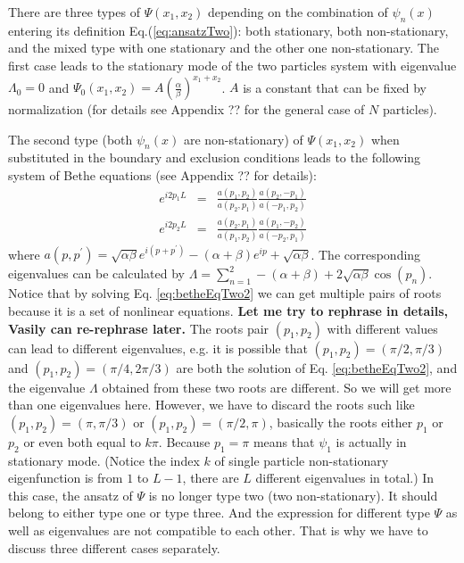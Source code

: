 \documentclass[aps,showpacs,twocolumn,floatfix,prx,superscriptaddress]{revtex4-1}
\begin{document}
There are three types of $\Psi(x_1, x_2)$ depending on the combination of $\psi_n(x)$ entering its definition Eq.(\ref{eq:ansatzTwo}): both stationary, both non-stationary, and the mixed type with one stationary and the other one non-stationary. The first case leads to the stationary mode of the two particles system with eigenvalue $\Lambda_0 = 0$ and $\Psi_0(x_1, x_2) = A \left(\frac{\alpha}{\beta}\right)^{x_1+x_2}$. $A$ is a constant that can be fixed by normalization (for details see Appendix ?? for the general case of $N$ particles).

The second type (both $\psi_n(x)$ are non-stationary) of $\Psi(x_1, x_2)$ when substituted in the boundary and exclusion conditions leads to the following system of Bethe equations \cite{} (see Appendix ?? for details):
\begin{subequations}
    \label{eq:betheEqTwo2}
    \begin{eqnarray}
        e^{i2p_1L} & = & \frac{a(p_1, p_2)}{a(p_2, p_1)} 
        \frac{a(p_2, -p_1)}{a(-p_1, p_2)}\\
        e^{i2p_2L} & = & \frac{a(p_2, p_1)}{a(p_1, p_2)} 
        \frac{a(p_1, -p_2)}{a(-p_2, p_1)}
    \end{eqnarray}
\end{subequations}
where $a(p, p^\prime) = \sqrt{\alpha\beta}e^{i(p+p^\prime)}-(\alpha+\beta)e^{ip}+\sqrt{\alpha\beta}$. 
The corresponding eigenvalues can be calculated by $\Lambda = \sum_{n=1}^2 -(\alpha+\beta)+2\sqrt{\alpha\beta}\cos(p_n)$. Notice that by solving Eq. \eqref{eq:betheEqTwo2} we can get multiple pairs of roots because it is a set of nonlinear equations. 
{\bf Let me try to rephrase in details, Vasily can re-rephrase later.} 
    The roots pair $(p_1, p_2)$ with different values can lead to different eigenvalues, e.g. it is possible that $(p_1, p_2) = (\pi/2, \pi/3)$ and $(p_1, p_2) = (\pi/4, 2\pi/3)$ are both the solution of Eq. \eqref{eq:betheEqTwo2}, and the eigenvalue $\Lambda$ obtained from these two roots are different. So we will get more than one eigenvalues here. However, we have to discard the roots such like $(p_1, p_2) = (\pi, \pi/3)$ or $(p_1, p_2) = (\pi/2, \pi)$, basically the roots either $p_1$ or $p_2$ or even both equal to $k\pi$. Because $p_1 = \pi$ means that $\psi_1$ is actually in stationary mode. (Notice the index $k$ of single particle non-stationary eigenfunction is from $1$ to $L-1$, there are $L$ different eigenvalues in total.) In this case, the ansatz of $\Psi$ is no longer type two (two non-stationary). It should belong to either type one or type three. And the expression for different type $\Psi$ as well as eigenvalues are not compatible to each other. That is why we have to discuss three different cases separately. 
\end{document}
